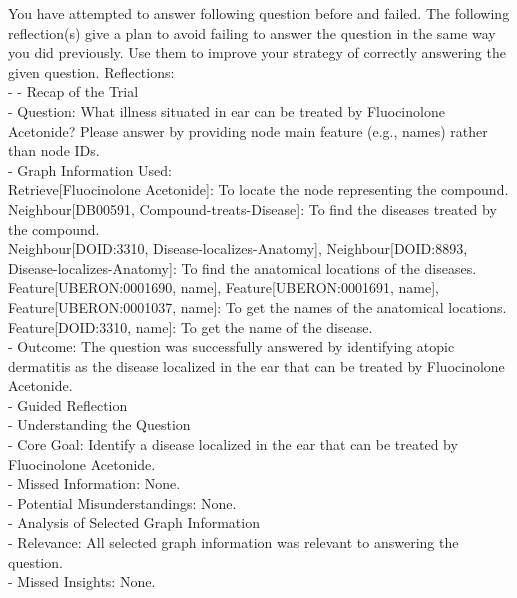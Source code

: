 \documentclass[11pt]{article}
\begin{document}
\begin{tcolorbox}[colback=white!10!white, colframe=blue!30!black, title=Reflection (Biomedical), boxrule=1pt, fontupper={\fontsize{7pt}{9pt}\selectfont}]
\justifying
\noindent
\raggedright

You have attempted to answer following question before and failed. The following reflection(s) give a plan to avoid failing to answer the question in the same way you did previously. Use them to improve your strategy of correctly answering the given question.
Reflections:\\
- - Recap of the Trial\\
  - Question: What illness situated in ear can be treated by Fluocinolone Acetonide? Please answer by providing node main feature (e.g., names) rather than node IDs.\\
  - Graph Information Used:\\
    Retrieve[Fluocinolone Acetonide]: To locate the node representing the compound.\\
    Neighbour[DB00591, Compound-treats-Disease]: To find the diseases treated by the compound.\\
    Neighbour[DOID:3310, Disease-localizes-Anatomy], Neighbour[DOID:8893, Disease-localizes-Anatomy]: To find the anatomical locations of the diseases.\\
    Feature[UBERON:0001690, name], Feature[UBERON:0001691, name], Feature[UBERON:0001037, name]: To get the names of the anatomical locations.\\
    Feature[DOID:3310, name]: To get the name of the disease.\\
  - Outcome: The question was successfully answered by identifying atopic dermatitis as the disease localized in the ear that can be treated by Fluocinolone Acetonide.\\
- Guided Reflection\\
  - Understanding the Question\\
    - Core Goal: Identify a disease localized in the ear that can be treated by Fluocinolone Acetonide.\\
    - Missed Information: None.\\
    - Potential Misunderstandings: None.\\
  - Analysis of Selected Graph Information\\
    - Relevance: All selected graph information was relevant to answering the question.\\
    - Missed Insights: None.\\

\end{tcolorbox}
\end{document}
